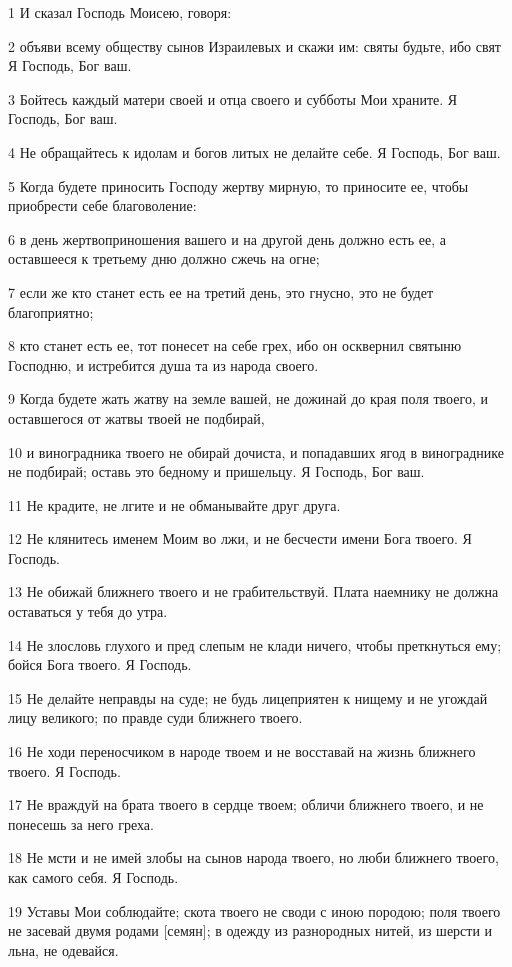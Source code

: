 \par 1 И сказал Господь Моисею, говоря:
\par 2 объяви всему обществу сынов Израилевых и скажи им: святы будьте, ибо свят Я Господь, Бог ваш.
\par 3 Бойтесь каждый матери своей и отца своего и субботы Мои храните. Я Господь, Бог ваш.
\par 4 Не обращайтесь к идолам и богов литых не делайте себе. Я Господь, Бог ваш.
\par 5 Когда будете приносить Господу жертву мирную, то приносите ее, чтобы приобрести себе благоволение:
\par 6 в день жертвоприношения вашего и на другой день должно есть ее, а оставшееся к третьему дню должно сжечь на огне;
\par 7 если же кто станет есть ее на третий день, это гнусно, это не будет благоприятно;
\par 8 кто станет есть ее, тот понесет на себе грех, ибо он осквернил святыню Господню, и истребится душа та из народа своего.
\par 9 Когда будете жать жатву на земле вашей, не дожинай до края поля твоего, и оставшегося от жатвы твоей не подбирай,
\par 10 и виноградника твоего не обирай дочиста, и попадавших ягод в винограднике не подбирай; оставь это бедному и пришельцу. Я Господь, Бог ваш.
\par 11 Не крадите, не лгите и не обманывайте друг друга.
\par 12 Не клянитесь именем Моим во лжи, и не бесчести имени Бога твоего. Я Господь.
\par 13 Не обижай ближнего твоего и не грабительствуй. Плата наемнику не должна оставаться у тебя до утра.
\par 14 Не злословь глухого и пред слепым не клади ничего, чтобы преткнуться ему; бойся Бога твоего. Я Господь.
\par 15 Не делайте неправды на суде; не будь лицеприятен к нищему и не угождай лицу великого; по правде суди ближнего твоего.
\par 16 Не ходи переносчиком в народе твоем и не восставай на жизнь ближнего твоего. Я Господь.
\par 17 Не враждуй на брата твоего в сердце твоем; обличи ближнего твоего, и не понесешь за него греха.
\par 18 Не мсти и не имей злобы на сынов народа твоего, но люби ближнего твоего, как самого себя. Я Господь.
\par 19 Уставы Мои соблюдайте; скота твоего не своди с иною породою; поля твоего не засевай двумя родами [семян]; в одежду из разнородных нитей, из шерсти и льна, не одевайся.
